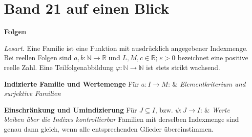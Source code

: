 \chapter[Band 21: Folgen]{Band 21 auf einen Blick}
\noindent\textbf{Folgen}\par\medskip
\noindent\emph{Lesart.}
Eine Familie ist eine Funktion mit ausdrücklich angegebener Indexmenge.
Bei reellen Folgen sind \(a,b\colon\mathbb N\to\mathbb R\) und
\(L,M,c\in\mathbb R\); \(\varepsilon>0\) bezeichnet eine positive reelle
Zahl. Eine Teilfolgenabbildung \(\varphi\colon\mathbb N\to\mathbb N\)
ist stets strikt wachsend.

\begin{BandUebersicht}
\textbf{Indizierte Familie und Wertemenge}
Für \(a\colon I\to M\):
&
\textit{Elementkriterium und surjektive Familien}
\\ \addlinespace[.8ex]

\textbf{Einschränkung und Umindizierung}
Für \(J\subseteq I\), bzw. \(\psi\colon J\to I\):
&
\textit{Werte bleiben über die Indizes kontrollierbar}
Familien mit derselben Indexmenge sind genau dann gleich, wenn
alle entsprechenden Glieder übereinstimmen.
\\ \addlinespace[.8ex]


\end{BandUebersicht}
